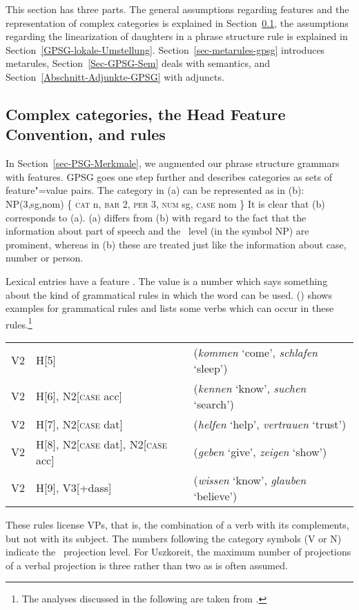 This section has three parts. The general assumptions regarding features and the representation of
complex categories is explained in Section~\ref{sec-complex-categories-gpsg}, the assumptions
regarding the linearization of daughters in a phrase structure rule is explained in
Section~\ref{GPSG-lokale-Umstellung}. Section~\ref{sec-metarules-gpsg} introduces metarules, Section~\ref{Sec-GPSG-Sem} deals with
semantics, and Section~\ref{Abschnitt-Adjunkte-GPSG} with adjuncts.

\subsection{Complex categories, the Head Feature Convention, and \xbar rules}
\label{sec-complex-categories-gpsg}

In Section~\ref{sec-PSG-Merkmale}, we augmented our phrase structure grammars with features. GPSG goes one step further and describes categories as sets of feature"=value pairs.
The category in (a) can be represented as in (b):
\eal
\ex NP(3,sg,{nom})
\ex \{ \textsc{cat} n, \textsc{bar} 2, \textsc{per} 3, \textsc{num} sg, \textsc{case} nom \} 
\zl
It is clear that (b) corresponds to (a). (a) differs from (b) with
regard to the fact that the information about part of speech and the \xbar~level (in the symbol NP)
are prominent, whereas in (b) these are treated just like the information about case,
number or person. 

Lexical entries have a feature \subcat. The value is a number
which says something about the kind of grammatical rules in which the word can be used. 
() shows examples for grammatical rules and lists some verbs which can occur in these rules.\footnote{
The analyses discussed in the following are taken from .
}
\ea
\label{gpsg-regeln}
\begin{tabular}[t]{@{}l@{~$\to$~}ll@{}}
V2  & H[5]                                    & (\emph{kommen} `come', \emph{schlafen} `sleep')\\
V2  & H[6], N2[\textsc{case} acc]                & (\emph{kennen} `know', \emph{suchen} `search')\\
V2  & H[7], N2[\textsc{case} dat]                & (\emph{helfen} `help', \emph{vertrauen} `trust')\\
V2  & H[8], N2[\textsc{case} dat], N2[\textsc{case} acc]  & (\emph{geben} `give', \emph{zeigen} `show')\\
V2  & H[9], V3[+dass]                         & (\emph{wissen} `know', \emph{glauben} `believe')\\
\end{tabular}
\z
%
These rules license VPs, that is, the combination of a verb with its complements, but not with its subject. The numbers following the category symbols (V or N) indicate the
\xbar~projection level. For Uszkoreit, the maximum number of projections of a verbal projection is three
rather than two as is often assumed.

